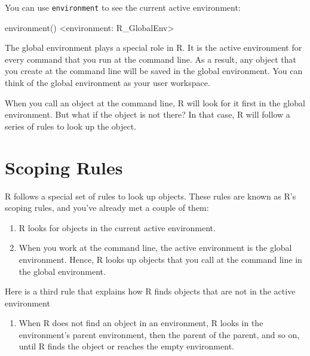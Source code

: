\documentclass[
  letterpaper,
  DIV=11,
  numbers=noendperiod]{scrbook}
\newenvironment{Shaded}{\begin{snugshade}}{\end{snugshade}}
\newcommand{\FunctionTok}[1]{\textcolor[rgb]{0.28,0.35,0.67}{#1}}
\newcommand{\NormalTok}[1]{\textcolor[rgb]{0.00,0.23,0.31}{#1}}
\newcommand{\SpecialCharTok}[1]{\textcolor[rgb]{0.37,0.37,0.37}{#1}}
\providecommand{\tightlist}{%
  \setlength{\itemsep}{0pt}\setlength{\parskip}{0pt}}
\begin{document}
You can use \texttt{environment} to see the current active environment:

\begin{Shaded}
\begin{Highlighting}[]
\FunctionTok{environment}\NormalTok{()}
\SpecialCharTok{\textless{}}\NormalTok{environment}\SpecialCharTok{:}\NormalTok{ R\_GlobalEnv}\SpecialCharTok{\textgreater{}}
\end{Highlighting}
\end{Shaded}

The global environment plays a special role in R. It is the active
environment for every command that you run at the command line. As a
result, any object that you create at the command line will be saved in
the global environment. You can think of the global environment as your
user workspace.

When you call an object at the command line, R will look for it first in
the global environment. But what if the object is not there? In that
case, R will follow a series of rules to look up the object.

\section{Scoping Rules}\label{scoping-rules}

R follows a special set of rules to look up objects. These rules are
known as R's scoping rules, and you've already met a couple of them:

\begin{enumerate}
\def\labelenumi{\arabic{enumi}.}
\tightlist
\item
  R looks for objects in the current active environment.
\item
  When you work at the command line, the active environment is the
  global environment. Hence, R looks up objects that you call at the
  command line in the global environment.
\end{enumerate}

Here is a third rule that explains how R finds objects that are not in
the active environment

\begin{enumerate}
\def\labelenumi{\arabic{enumi}.}
\setcounter{enumi}{2}
\tightlist
\item
  When R does not find an object in an environment, R looks in the
  environment's parent environment, then the parent of the parent, and
  so on, until R finds the object or reaches the empty environment.
\end{enumerate}
\end{document}
